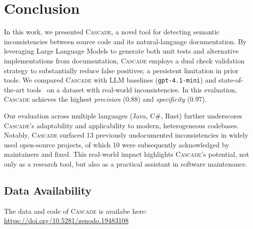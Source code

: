 \documentclass[acmsmall, screen]{acmart}
\newcommand{\tool}{\textsc{Cascade}\xspace}
\begin{document}
\section{Conclusion}\label{sec:conc}
In this work, we presented \tool, a novel tool for detecting semantic inconsistencies between source code and its natural-language documentation. By leveraging Large Language Models to generate both unit tests and alternative implementations from documentation, \tool employs a dual check validation strategy to substantially reduce false positives; a persistent limitation in prior tools. 
We compared \tool with LLM baselines (\texttt{gpt-4.1-mini}) and state-of-the-art tools~\cite{docchecker, carlama} on a dataset with real-world inconsistencies. In this evaluation, \tool achieves the highest \textit{precision} (0.88) and \textit{specificity} (0.97).

Our evaluation across multiple languages (Java, C\#, Rust) further underscores \tool's adaptability and applicability to modern, heterogeneous codebases. Notably, \tool surfaced 13 previously undocumented inconsistencies in widely used open-source projects, of which 10 were subsequently acknowledged by maintainers and fixed. This real-world impact highlights \tool's potential, not only as a research tool, but also as a practical assistant in software maintenance.

\subsection*{Data Availability}
\label{sec:data-availability}
The data and code of \tool is availabe here: \url{https://doi.org/10.5281/zenodo.19483108}

\clearpage


\end{document}

